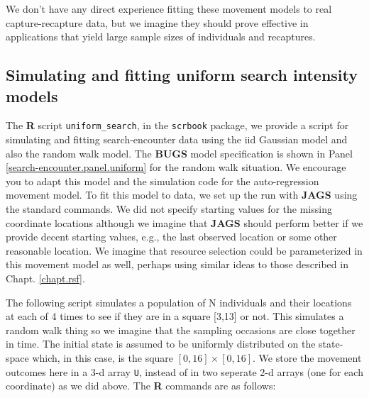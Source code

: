 We don't have any direct experience fitting these movement models to
real capture-recapture data, but we imagine they should prove
effective in applications that yield large sample sizes of individuals
and recaptures.

\subsection{Simulating and fitting uniform search intensity models}

The {\bf R} script \mbox{\tt uniform\_search}, in the \mbox{\tt scrbook} package, we provide a script for simulating
and fitting search-encounter data using the iid Gaussian model and
also the random walk model.  The {\bf BUGS} model specification is
shown in Panel \ref{search-encounter.panel.uniform} for the random
walk situation. We encourage you to adapt this model and the
simulation code for the auto-regression movement model.  To fit this
model to data, we set up the run with {\bf JAGS} using the standard
commands. We did not specify starting values for the missing
coordinate locations although we imagine that {\bf JAGS} should
perform better if we provide decent starting values, e.g., the last
observed location or some other reasonable location.  We imagine that
resource selection could be parameterized in this movement model as
well, perhaps using similar ideas to those described in
Chapt. \ref{chapt.rsf}.

The following script simulates a population of N individuals and their
locations at each of 4 times to see if they are in a square [3,13] or
not.  This simulates a random walk thing so we imagine that the
sampling occasions are close together in time.  The initial state is
assumed to be uniformly distributed on the state-space which, in this
case, is the square $[0,16] \times [0,16]$. We store the movement
outcomes here in a 3-d array \mbox{\tt U}, instead of in two seperate
2-d arrays (one for each coordinate) as we did above.  The {\bf R}
commands are as follows:

